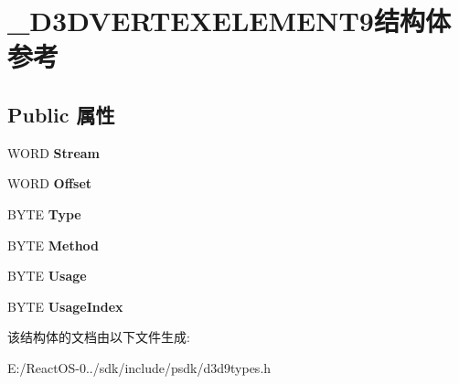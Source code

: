 \hypertarget{struct___d3_d_v_e_r_t_e_x_e_l_e_m_e_n_t9}{}\section{\+\_\+\+D3\+D\+V\+E\+R\+T\+E\+X\+E\+L\+E\+M\+E\+N\+T9结构体 参考}
\label{struct___d3_d_v_e_r_t_e_x_e_l_e_m_e_n_t9}
\subsection*{Public 属性}
\begin{DoxyCompactItemize}
\item 
\mbox{\label{struct___d3_d_v_e_r_t_e_x_e_l_e_m_e_n_t9_ab7ee5a3406ce5cd8a66eb7faddb85130}} 
W\+O\+RD {\bfseries Stream}
\item 
\mbox{\label{struct___d3_d_v_e_r_t_e_x_e_l_e_m_e_n_t9_a905221010f602164f3c85cc5e6969ad5}} 
W\+O\+RD {\bfseries Offset}
\item 
\mbox{\label{struct___d3_d_v_e_r_t_e_x_e_l_e_m_e_n_t9_abe62de49e80a60f5c9d009b385428af6}} 
B\+Y\+TE {\bfseries Type}
\item 
\mbox{\label{struct___d3_d_v_e_r_t_e_x_e_l_e_m_e_n_t9_a958e6de1ef5bdb161f11a64d2f2f8724}} 
B\+Y\+TE {\bfseries Method}
\item 
\mbox{\label{struct___d3_d_v_e_r_t_e_x_e_l_e_m_e_n_t9_a7379c2ecc48cfee9793b61414ba1ad26}} 
B\+Y\+TE {\bfseries Usage}
\item 
\mbox{\label{struct___d3_d_v_e_r_t_e_x_e_l_e_m_e_n_t9_ae7d4229b1cf3f1fb9d18565444afe7a1}} 
B\+Y\+TE {\bfseries Usage\+Index}
\end{DoxyCompactItemize}


该结构体的文档由以下文件生成\+:\begin{DoxyCompactItemize}
\item 
E\+:/\+React\+O\+S-\/0../sdk/include/psdk/d3d9types.\+h\end{DoxyCompactItemize}
